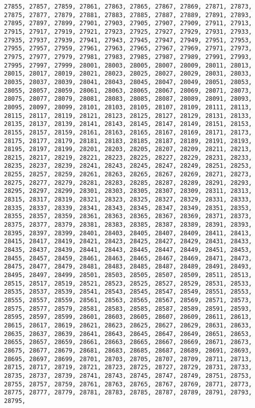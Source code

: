 \documentclass[11pt]{article}
\begin{document}
\begin{Verbatim}[commandchars=\\\{\}]
27855, 27857, 27859, 27861, 27863, 27865, 27867, 27869, 27871, 27873, 27875, 27877, 27879, 27881, 27883, 27885, 27887, 27889, 27891, 27893, 27895, 27897, 27899, 27901, 27903, 27905, 27907, 27909, 27911, 27913, 27915, 27917, 27919, 27921, 27923, 27925, 27927, 27929, 27931, 27933, 27935, 27937, 27939, 27941, 27943, 27945, 27947, 27949, 27951, 27953, 27955, 27957, 27959, 27961, 27963, 27965, 27967, 27969, 27971, 27973, 27975, 27977, 27979, 27981, 27983, 27985, 27987, 27989, 27991, 27993, 27995, 27997, 27999, 28001, 28003, 28005, 28007, 28009, 28011, 28013, 28015, 28017, 28019, 28021, 28023, 28025, 28027, 28029, 28031, 28033, 28035, 28037, 28039, 28041, 28043, 28045, 28047, 28049, 28051, 28053, 28055, 28057, 28059, 28061, 28063, 28065, 28067, 28069, 28071, 28073, 28075, 28077, 28079, 28081, 28083, 28085, 28087, 28089, 28091, 28093, 28095, 28097, 28099, 28101, 28103, 28105, 28107, 28109, 28111, 28113, 28115, 28117, 28119, 28121, 28123, 28125, 28127, 28129, 28131, 28133, 28135, 28137, 28139, 28141, 28143, 28145, 28147, 28149, 28151, 28153, 28155, 28157, 28159, 28161, 28163, 28165, 28167, 28169, 28171, 28173, 28175, 28177, 28179, 28181, 28183, 28185, 28187, 28189, 28191, 28193, 28195, 28197, 28199, 28201, 28203, 28205, 28207, 28209, 28211, 28213, 28215, 28217, 28219, 28221, 28223, 28225, 28227, 28229, 28231, 28233, 28235, 28237, 28239, 28241, 28243, 28245, 28247, 28249, 28251, 28253, 28255, 28257, 28259, 28261, 28263, 28265, 28267, 28269, 28271, 28273, 28275, 28277, 28279, 28281, 28283, 28285, 28287, 28289, 28291, 28293, 28295, 28297, 28299, 28301, 28303, 28305, 28307, 28309, 28311, 28313, 28315, 28317, 28319, 28321, 28323, 28325, 28327, 28329, 28331, 28333, 28335, 28337, 28339, 28341, 28343, 28345, 28347, 28349, 28351, 28353, 28355, 28357, 28359, 28361, 28363, 28365, 28367, 28369, 28371, 28373, 28375, 28377, 28379, 28381, 28383, 28385, 28387, 28389, 28391, 28393, 28395, 28397, 28399, 28401, 28403, 28405, 28407, 28409, 28411, 28413, 28415, 28417, 28419, 28421, 28423, 28425, 28427, 28429, 28431, 28433, 28435, 28437, 28439, 28441, 28443, 28445, 28447, 28449, 28451, 28453, 28455, 28457, 28459, 28461, 28463, 28465, 28467, 28469, 28471, 28473, 28475, 28477, 28479, 28481, 28483, 28485, 28487, 28489, 28491, 28493, 28495, 28497, 28499, 28501, 28503, 28505, 28507, 28509, 28511, 28513, 28515, 28517, 28519, 28521, 28523, 28525, 28527, 28529, 28531, 28533, 28535, 28537, 28539, 28541, 28543, 28545, 28547, 28549, 28551, 28553, 28555, 28557, 28559, 28561, 28563, 28565, 28567, 28569, 28571, 28573, 28575, 28577, 28579, 28581, 28583, 28585, 28587, 28589, 28591, 28593, 28595, 28597, 28599, 28601, 28603, 28605, 28607, 28609, 28611, 28613, 28615, 28617, 28619, 28621, 28623, 28625, 28627, 28629, 28631, 28633, 28635, 28637, 28639, 28641, 28643, 28645, 28647, 28649, 28651, 28653, 28655, 28657, 28659, 28661, 28663, 28665, 28667, 28669, 28671, 28673, 28675, 28677, 28679, 28681, 28683, 28685, 28687, 28689, 28691, 28693, 28695, 28697, 28699, 28701, 28703, 28705, 28707, 28709, 28711, 28713, 28715, 28717, 28719, 28721, 28723, 28725, 28727, 28729, 28731, 28733, 28735, 28737, 28739, 28741, 28743, 28745, 28747, 28749, 28751, 28753, 28755, 28757, 28759, 28761, 28763, 28765, 28767, 28769, 28771, 28773, 28775, 28777, 28779, 28781, 28783, 28785, 28787, 28789, 28791, 28793, 28795, 
\end{Verbatim}
\end{document}
